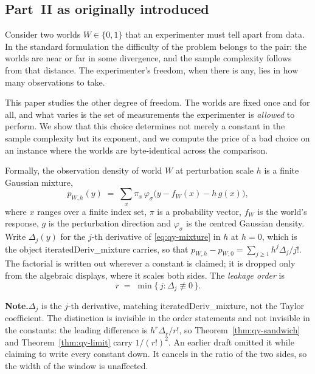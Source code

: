 \documentclass[conference]{IEEEtran}
\theoremstyle{definition}
\newcommand{\lean}[1]{\textsf{\footnotesize #1}}
\newif\ifshownotes\shownotestrue
\newcommand{\NOTEPAR}[1]{\ifshownotes\par\vspace{2pt}\noindent%
  {\color{notecol}\textsf{\footnotesize\textbf{Note.}\;#1}}\par\vspace{2pt}\fi}
\begin{document}
\subsection{Part~II as originally introduced}


Consider two worlds $W\in\{0,1\}$ that an experimenter must tell apart from data. In the
standard formulation the difficulty of the problem belongs to the pair: the worlds are near
or far in some divergence, and the sample complexity follows from that distance. The
experimenter's freedom, when there is any, lies in how many observations to take.

This paper studies the other degree of freedom. The worlds are fixed once and for all, and
what varies is the set of measurements the experimenter is \emph{allowed} to perform. We
show that this choice determines not merely a constant in the sample complexity but its
exponent, and we compute the price of a bad choice on an instance where the worlds are
byte-identical across the comparison.

Formally, the observation density of world $W$ at perturbation scale $h$ is a finite
Gaussian mixture,
\begin{equation}
p_{W,h}(y)\;=\;\sum_{x}\pi_{x}\,
   \varphi_{\sigma}\bigl(y-f_{W}(x)-h\,g(x)\bigr),
\label{eq:qy-mixture}
\end{equation}
where $x$ ranges over a finite index set, $\pi$ is a probability vector, $f_{W}$ is the
world's response, $g$ is the perturbation direction and $\varphi_{\sigma}$ is the centred
Gaussian density. Write $\Delta_{j}(y)$ for the $j$-th derivative of \eqref{eq:qy-mixture} in
$h$ at $h=0$, which is the object \lean{iteratedDeriv\_mixture} carries, so that
$p_{W,h}-p_{W,0}=\sum_{j\ge1}h^{j}\Delta_{j}/j!$. The factorial is written out wherever a
constant is claimed; it is dropped only from the algebraic displays, where it scales both
sides. The \emph{leakage order} is
\begin{equation}
r \;=\; \min\{\, j : \Delta_{j}\not\equiv 0 \,\}.
\label{eq:qy-order}
\end{equation}
\NOTEPAR{$\Delta_{j}$ is the $j$-th derivative, matching \lean{iteratedDeriv\_mixture},
not the Taylor coefficient. The distinction is invisible in the order statements and not
invisible in the constants: the leading difference is $h^{r}\Delta_{r}/r!$, so
Theorem~\ref{thm:qy-sandwich} and Theorem~\ref{thm:qy-limit} carry $1/(r!)^{2}$. An earlier draft
omitted it while claiming to write every constant down. It cancels in the ratio of the two
sides, so the width of the window is unaffected.}
\end{document}
